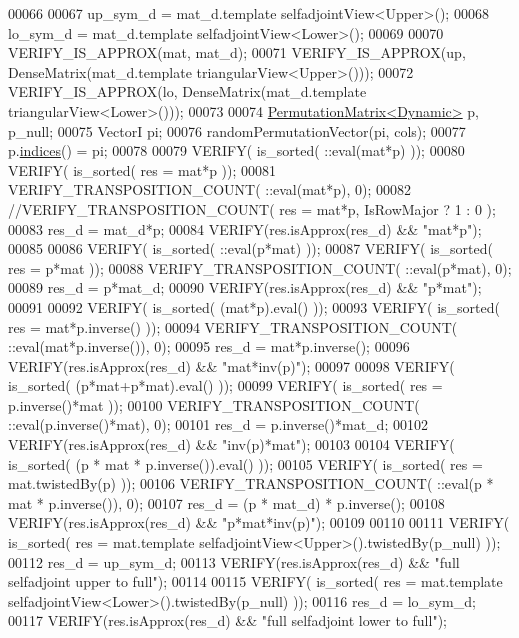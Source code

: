 \begin{DoxyCode}
00066   
00067   up\_sym\_d = mat\_d.template selfadjointView<Upper>();
00068   lo\_sym\_d = mat\_d.template selfadjointView<Lower>();
00069   
00070   VERIFY\_IS\_APPROX(mat, mat\_d);
00071   VERIFY\_IS\_APPROX(up, DenseMatrix(mat\_d.template triangularView<Upper>()));
00072   VERIFY\_IS\_APPROX(lo, DenseMatrix(mat\_d.template triangularView<Lower>()));
00073   
00074   \hyperlink{group___core___module_class_eigen_1_1_permutation_matrix}{PermutationMatrix<Dynamic>} p, p\_null;
00075   VectorI pi;
00076   randomPermutationVector(pi, cols);
00077   p.\hyperlink{group___core___module_a2f1ab379207fcd1ceb33941e25cf50c2}{indices}() = pi;
00078 
00079   VERIFY( is\_sorted( ::eval(mat*p) ));
00080   VERIFY( is\_sorted( res = mat*p ));
00081   VERIFY\_TRANSPOSITION\_COUNT( ::eval(mat*p), 0);
00082   \textcolor{comment}{//VERIFY\_TRANSPOSITION\_COUNT( res = mat*p, IsRowMajor ? 1 : 0 );}
00083   res\_d = mat\_d*p;
00084   VERIFY(res.isApprox(res\_d) && \textcolor{stringliteral}{"mat*p"});
00085 
00086   VERIFY( is\_sorted( ::eval(p*mat) ));
00087   VERIFY( is\_sorted( res = p*mat ));
00088   VERIFY\_TRANSPOSITION\_COUNT( ::eval(p*mat), 0);
00089   res\_d = p*mat\_d;
00090   VERIFY(res.isApprox(res\_d) && \textcolor{stringliteral}{"p*mat"});
00091 
00092   VERIFY( is\_sorted( (mat*p).eval() ));
00093   VERIFY( is\_sorted( res = mat*p.inverse() ));
00094   VERIFY\_TRANSPOSITION\_COUNT( ::eval(mat*p.inverse()), 0);
00095   res\_d = mat*p.inverse();
00096   VERIFY(res.isApprox(res\_d) && \textcolor{stringliteral}{"mat*inv(p)"});
00097 
00098   VERIFY( is\_sorted( (p*mat+p*mat).eval() ));
00099   VERIFY( is\_sorted( res = p.inverse()*mat ));
00100   VERIFY\_TRANSPOSITION\_COUNT( ::eval(p.inverse()*mat), 0);
00101   res\_d = p.inverse()*mat\_d;
00102   VERIFY(res.isApprox(res\_d) && \textcolor{stringliteral}{"inv(p)*mat"});
00103 
00104   VERIFY( is\_sorted( (p * mat * p.inverse()).eval() ));
00105   VERIFY( is\_sorted( res = mat.twistedBy(p) ));
00106   VERIFY\_TRANSPOSITION\_COUNT( ::eval(p * mat * p.inverse()), 0);
00107   res\_d = (p * mat\_d) * p.inverse();
00108   VERIFY(res.isApprox(res\_d) && \textcolor{stringliteral}{"p*mat*inv(p)"});
00109 
00110   
00111   VERIFY( is\_sorted( res = mat.template selfadjointView<Upper>().twistedBy(p\_null) ));
00112   res\_d = up\_sym\_d;
00113   VERIFY(res.isApprox(res\_d) && \textcolor{stringliteral}{"full selfadjoint upper to full"});
00114   
00115   VERIFY( is\_sorted( res = mat.template selfadjointView<Lower>().twistedBy(p\_null) ));
00116   res\_d = lo\_sym\_d;
00117   VERIFY(res.isApprox(res\_d) && \textcolor{stringliteral}{"full selfadjoint lower to full"});

\end{DoxyCode}
